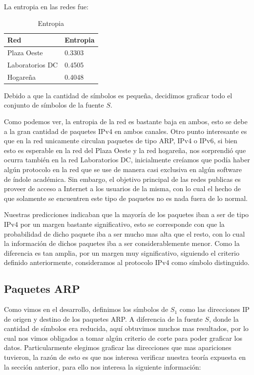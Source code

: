 La entropia en las redes fue:

\begin{table}[H]
\centering
\caption{Entropia}
\label{my-label}
\begin{tabular}{ll}
\hline
Red         & Entropia \\ \hline
Plaza Oeste & 0.3303   \\
Laboratorios DC    & 0.4505   \\ 
Hogareña & 0.4048   \\  \hline
\end{tabular}
\end{table}

Debido a que la cantidad de símbolos es pequeña, decidimos graficar todo el conjunto de símbolos de la fuente $S$.

Como podemos ver, la entropia de la red es bastante baja en ambos, esto se debe a la gran cantidad de paquetes IPv4 en ambos canales. Otro punto interesante es que en la red unicamente circulan paquetes de tipo ARP, IPv4 o IPv6, si bien esto es esperable en la red del Plaza Oeste y la red hogareña, nos sorprendió que ocurra también en la red Laboratorios DC, inicialmente creíamos que podía haber algún protocolo en la red que se use de manera casi exclusiva en algún software de índole académica. Sin embargo, el objetivo principal de las redes publicas es proveer de acceso a Internet a los usuarios de la misma, con lo cual el hecho de que solamente se encuentren este tipo de paquetes no es nada fuera de lo normal.

Nuestras predicciones indicaban que la mayoría de los paquetes iban a ser de tipo IPv4 por un margen bastante significativo, esto se corresponde con que la probabilidad de dicho paquete iba a ser mucho mas alta que el resto, con lo cual la información de dichos paquetes iba a ser considerablemente menor. Como la diferencia es tan amplia, por un margen muy significativo, siguiendo el criterio definido anteriormente, consideramos al protocolo IPv4 como símbolo distinguido.

\pagebreak

\subsection{Paquetes ARP}

Como vimos en el desarrollo, definimos los símbolos de $S_1$ como las direcciones IP de origen y destino de los paquetes ARP. A diferencia de la fuente $S$, donde la cantidad de símbolos era reducida, aquí obtuvimos muchos mas resultados, por lo cual nos vimos obligados a tomar algún criterio de corte para poder graficar los datos. Particularmente elegimos graficar las direcciones que mas apariciones tuvieron, la razón de esto es que nos interesa verificar nuestra teoría expuesta en la sección anterior, para ello nos interesa la siguiente información:

